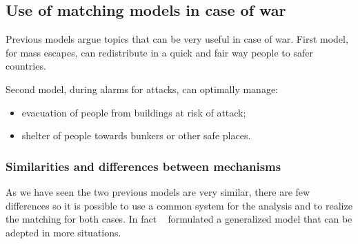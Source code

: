 \subsection{Use of matching models in case of war}\label{use-of-matching-model-in-case-of-war}%
Previous models argue topics that can be very useful in case of war. First model, for mass escapes, can redistribute in a quick and fair way people to safer countries.

Second model, during alarms for attacks, can optimally manage:
\begin{itemize}
    \item evacuation of people from buildings at risk of attack;
    \item shelter of people towards bunkers or other safe places.
\end{itemize}


\subsubsection{Similarities and differences between mechanisms}\label{similarities-and-differences-between-mechanisms}

As we have seen the two previous models are very similar, there are few differences so it is possible to use a
common system for the analysis and to realize the matching for both cases.
In fact ~\citet{delacretaz_2020} formulated a generalized model that can be adepted in more situations.

